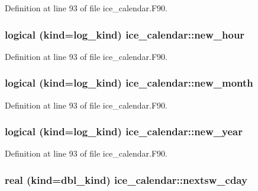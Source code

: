 Definition at line 93 of file ice\_\-calendar.F90.\hypertarget{namespaceice__calendar_a0c8bfc71143cc3c7aef340ad41a9068d}{
\subsubsection[{new\_\-hour}]{\setlength{\rightskip}{0pt plus 5cm}logical (kind=log\_\-kind) {\bf ice\_\-calendar::new\_\-hour}}}
\label{namespaceice__calendar_a0c8bfc71143cc3c7aef340ad41a9068d}


Definition at line 93 of file ice\_\-calendar.F90.\hypertarget{namespaceice__calendar_adf4af22505e09a7ed33b5c480cce75af}{
\subsubsection[{new\_\-month}]{\setlength{\rightskip}{0pt plus 5cm}logical (kind=log\_\-kind) {\bf ice\_\-calendar::new\_\-month}}}
\label{namespaceice__calendar_adf4af22505e09a7ed33b5c480cce75af}


Definition at line 93 of file ice\_\-calendar.F90.\hypertarget{namespaceice__calendar_a2d0b7e0b5144d49dd2e39690c5cde21f}{
\subsubsection[{new\_\-year}]{\setlength{\rightskip}{0pt plus 5cm}logical (kind=log\_\-kind) {\bf ice\_\-calendar::new\_\-year}}}
\label{namespaceice__calendar_a2d0b7e0b5144d49dd2e39690c5cde21f}


Definition at line 93 of file ice\_\-calendar.F90.\hypertarget{namespaceice__calendar_a04f5a8dadd1f3a10e3909afc246aebe4}{
\subsubsection[{nextsw\_\-cday}]{\setlength{\rightskip}{0pt plus 5cm}real (kind=dbl\_\-kind) {\bf ice\_\-calendar::nextsw\_\-cday}}}
\label{namespaceice__calendar_a04f5a8dadd1f3a10e3909afc246aebe4}



